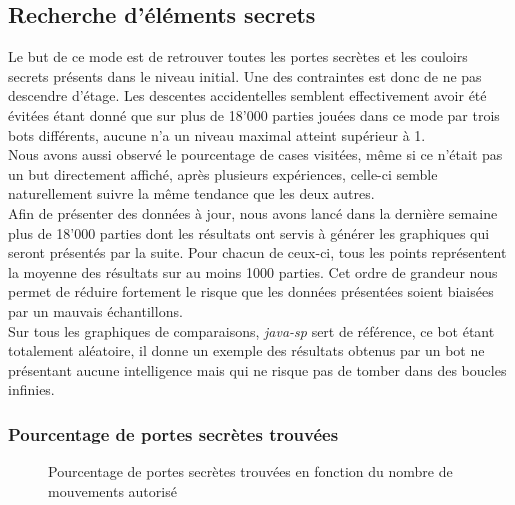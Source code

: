 \documentclass[a4paper,12pt]{article}
\begin{document}
\subsection{Recherche d'éléments secrets}
Le but de ce mode est de retrouver toutes les portes secrètes et les couloirs
secrets présents dans le niveau initial. Une des contraintes est donc de ne pas
descendre d'étage. Les descentes accidentelles semblent effectivement avoir été
évitées étant donné que sur plus de 18'000 parties jouées dans ce mode par trois
bots différents, aucune n'a un niveau maximal atteint supérieur à 1.
\\
Nous avons aussi observé le pourcentage de cases visitées, même si ce n'était
pas un but directement affiché, après plusieurs expériences, celle-ci semble
naturellement suivre la même tendance que les deux autres.
\\
Afin de présenter des données à jour, nous avons lancé dans la dernière semaine
plus de 18'000 parties dont les résultats ont servis à générer les graphiques
qui seront présentés par la suite. Pour chacun de ceux-ci, tous les points
représentent la moyenne des résultats sur au moins 1000 parties. Cet ordre de
grandeur nous permet de réduire fortement le risque que les données présentées
soient biaisées par un mauvais échantillons.
\\
Sur tous les graphiques de comparaisons, {\em java-sp} sert de référence, ce bot
étant totalement aléatoire, il donne un exemple des résultats obtenus par un bot
ne présentant aucune intelligence mais qui ne risque pas de tomber dans des
boucles infinies.

\subsubsection{Pourcentage de portes secrètes trouvées}

\begin{figure}[H]
  \caption{\label{fig:sdoors_found} Pourcentage de portes secrètes trouvées en
    fonction du nombre de mouvements autorisé}
\end{figure}
\end{document}
